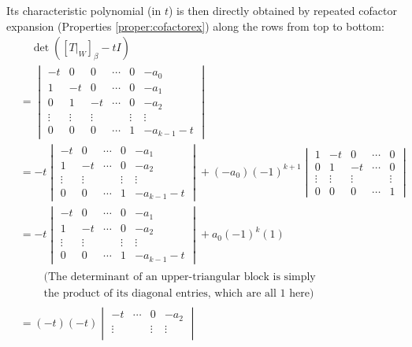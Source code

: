 Its characteristic polynomial (in $t$) is then directly obtained by repeated cofactor expansion (Properties \ref{proper:cofactorex}) along the rows from top to bottom:
\begin{align}
&\quad \det([T|_W]_\beta - t I) \nonumber \\
&= \begin{vmatrix}
-t & 0 & 0 & \cdots & 0 & -a_0 \\
1 & -t & 0 & \cdots & 0 & -a_1 \\
0 & 1 & -t & \cdots & 0 & -a_2 \\
\vdots & \vdots & \vdots & & \vdots & \vdots \\
0 & 0 & 0 & \cdots & 1 & -a_{k-1}-t
\end{vmatrix} \nonumber \\
&=
-t
\begin{vmatrix}
-t & 0 & \cdots & 0 & -a_1 \\
1 & -t & \cdots & 0 & -a_2 \\
\vdots & \vdots  & & \vdots & \vdots \\
0 & 0 & \cdots & 1 & -a_{k-1}-t
\end{vmatrix}
+ (-a_0) (-1)^{k+1}
\begin{vmatrix}
1 & -t & 0 & \cdots & 0 \\
0 & 1 & -t & \cdots & 0 \\
\vdots & \vdots & \vdots & & \vdots \\
0 & 0 & 0 & \cdots & 1 
\end{vmatrix} \nonumber \\
&= -t
\begin{vmatrix}
-t & 0 & \cdots & 0 & -a_1 \\
1 & -t & \cdots & 0 & -a_2 \\
\vdots & \vdots  & & \vdots & \vdots \\
0 & 0 & \cdots & 1 & -a_{k-1}-t
\end{vmatrix}
+ a_0 (-1)^k (1) \nonumber \\
&\quad 
\begin{aligned}
&\text{(The determinant of an upper-triangular block is simply} \\    
&\text{the product of its diagonal entries, which are all $1$ here)}
\end{aligned} \nonumber \\
&= (-t)(-t)
\begin{vmatrix}
-t & \cdots & 0 & -a_2 \\
\vdots & & \vdots & \vdots \\

\end{vmatrix}
\end{align}
